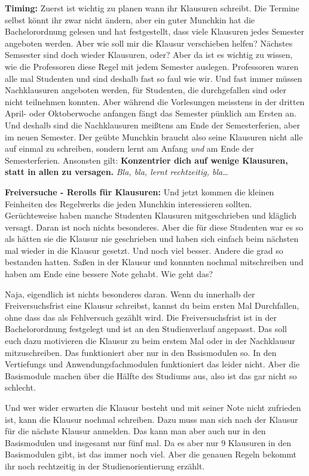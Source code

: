 \textbf{Timing:}
Zuerst ist wichtig zu planen wann ihr Klausuren schreibt.
Die Termine selbst k\"onnt ihr zwar nicht \"andern, aber ein guter Munchkin hat die Bachelorordnung gelesen
und hat festgestellt, dass viele Klausuren jedes Semester angeboten werden. Aber wie soll mir die Klausur verschieben helfen?
N\"achstes Semsester sind doch wieder Klausuren, oder? Aber da ist es wichtig
zu wissen, wie die Professoren diese Regel mit jedem Semester auslegen.
Professoren waren alle mal Studenten und sind deshalb fast so faul wie wir.
Und fast immer m\"ussen Nachklausuren angeboten werden, f\"ur Studenten, die durchgefallen sind oder nicht teilnehmen konnten.
Aber w\"ahrend die Vorlesungen meisstens in der dritten April- oder Oktoberwoche anfangen f\"angt das Semester p\"unklich am Ersten an.
Und deshalb sind die Nachklausuren mei{\ss}tens am Ende der Semesterferien, aber im neuen Semester. Der
ge\"ubte Munchkin braucht also seine Klausuren nicht alle auf einmal zu
schreiben, sondern lernt am Anfang \emph{und} am Ende der Semesterferien.
Ansonsten gilt: \textbf{Konzentrier dich auf wenige Klausuren, statt in allen zu versagen.}
\emph{Bla, bla, lernt rechtzeitig, bla\dots}

\textbf{Freiversuche - Rerolls f\"ur Klausuren:}
Und jetzt kommen die kleinen Feinheiten des Regelwerks die jeden Munchkin interessieren sollten.
Ger\"uchteweise haben manche Studenten Klausuren mitgeschrieben und kl\"aglich versagt. Daran ist noch nichts besonderes.
Aber die f\"ur diese Studenten war es so als h\"atten sie die Klausur nie
geschrieben und haben sich einfach beim n\"achsten mal wieder in die Klausur
gesetzt. Und noch viel besser. Andere die grad so bestanden hatten. Sa{\ss}en
in der Klausur und konnnten nochmal mitschreiben und haben am Ende eine bessere
Note gehabt. Wie geht das?

Naja, eigendlich ist nichts besonderes daran. Wenn du innerhalb der
Freiversuchsfrist eine Klausur schreibst, kannst du beim ersten Mal
Durchfallen, ohne dass das als Fehlversuch gez\"ahlt wird.
Die Freiversuchsfrist ist in der Bachelorordnung festgelegt und ist an den Studienverlauf angepasst.
Das soll euch dazu motivieren die Klausur zu beim erstem Mal oder in der Nachklausur mitzuschreiben.
Das funktioniert aber nur in den Basismodulen so. In den Vertiefungs und Anwendungsfachmodulen funktioniert das leider nicht.
Aber die Basismodule machen \"uber die H\"alfte des Studiums aus, also ist das gar nicht so schlecht.

Und wer wider erwarten die Klausur besteht und mit seiner Note nicht zufrieden
ist, kann die Klausur nochmal schreiben. Dazu muss man sich nach der Klausur
f\"ur die n\"achste Klausur anmelden. Das kann man aber auch nur in den
Basismodulen und insgesamt nur f\"unf mal. Da es aber nur 9 Klausuren in den Basismodulen gibt,
ist das immer noch viel. Aber die genauen Regeln bekommt ihr noch rechtzeitig in der Studienorientierung erz\"ahlt.

